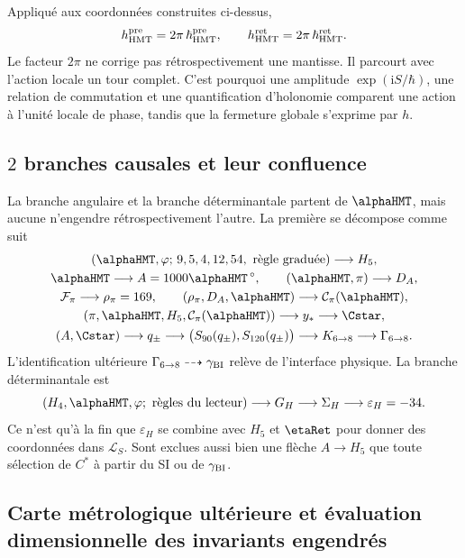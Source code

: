 Appliqué aux coordonnées construites ci-dessus,
\[
 h_{\rm HMT}^{\rm pre}
 =2\pi\,\hbar_{\rm HMT}^{\rm pre},\qquad
 h_{\rm HMT}^{\rm ret}
 =2\pi\,\hbar_{\rm HMT}^{\rm ret}.
\]
Le facteur \(2\pi\) ne corrige pas rétrospectivement une mantisse. Il parcourt avec l’action locale un tour complet. C’est pourquoi une amplitude \(\exp(\mathrm iS/\hbar)\), une relation de commutation et une quantification d’holonomie comparent une action à l’unité locale de phase, tandis que la fermeture globale s’exprime par \(h\).

\subsection{\(2\) branches causales et leur confluence}

La branche angulaire et la branche déterminantale partent de \(\alphaHMT\), mais aucune n’engendre rétrospectivement l’autre. La première se décompose comme suit
\[
\begin{gathered}
(\alphaHMT,\varphi;\,9,5,4,12,54,\text{ règle graduée})
\longrightarrow H_5,\\
\alphaHMT\longrightarrow A=1000\alphaHMT\,{}^\circ,
\qquad
(\alphaHMT,\pi)\longrightarrow D_A,\\
\mathcal F_\pi\longrightarrow\rho_\pi=169,\qquad
(\rho_\pi,D_A,\alphaHMT)\longrightarrow\mathcal C_\pi(\alphaHMT),\\
(\pi,\alphaHMT,H_5,\mathcal C_\pi(\alphaHMT))
\longrightarrow y_*\longrightarrow\Cstar,\\
(A,\Cstar)\longrightarrow q_\pm
\longrightarrow\bigl(S_{90}(q_\pm),S_{120}(q_\pm)\bigr)
\longrightarrow K_{6\to8}
\longrightarrow\Gamma_{6\to8}.
\end{gathered}
\]
L’identification ultérieure \(\Gamma_{6\to8}\dashrightarrow\gamma_{\rm BI}\) relève de l’interface physique. La branche déterminantale est
\[
(H_4,\alphaHMT,\varphi;\text{ règles du lecteur})
\longrightarrow G_H
\longrightarrow\Sigma_H
\longrightarrow\varepsilon_H=-34.
\]
Ce n’est qu’à la fin que \(\varepsilon_H\) se combine avec \(H_5\) et \(\etaRet\) pour donner des coordonnées dans \(\mathcal L_S\). Sont exclues aussi bien une flèche \(A\to H_5\) que toute sélection de \(C^*\) à partir du SI ou de \(\gamma_{\rm BI}\).

\subsection{Carte métrologique ultérieure et évaluation dimensionnelle des invariants engendrés}

